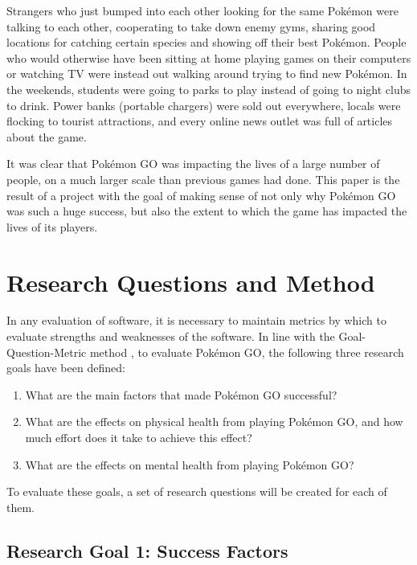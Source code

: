 Strangers who just bumped into each other looking for the same Pokémon were talking to each other, cooperating to take down enemy gyms, sharing good locations for catching certain species and showing off their best Pokémon. People who would otherwise have been sitting at home playing games on their computers or watching TV were instead out walking around trying to find new Pokémon. In the weekends, students were going to parks to play instead of going to night clubs to drink.  Power banks (portable chargers) were sold out everywhere, locals were flocking to tourist attractions, and every online news outlet was full of articles about the game.

It was clear that Pokémon GO was impacting the lives of a large number of people, on a much larger scale than previous games had done. This paper is the result of a project with the goal of making sense of not only why Pokémon GO was such a huge success, but also the extent to which the game has impacted the lives of its players.

\section{Research Questions and Method}
\label{section:research-questions}

In any evaluation of software, it is necessary to maintain metrics by which to evaluate strengths and weaknesses of the software. In line with the Goal-Question-Metric method , to evaluate Pokémon GO, the following three research goals have been defined:

\begin{enumerate}[label=RG{\arabic*}]
	\item What are the main factors that made Pokémon GO successful?
	\item What are the effects on physical health from playing Pokémon GO, and how much effort does it take to achieve this effect?
	\item What are the effects on mental health from playing Pokémon GO?
\end{enumerate}

To evaluate these goals, a set of research questions will be created for each of them.

\subsection{Research Goal 1: Success Factors}
\label{rg1}

